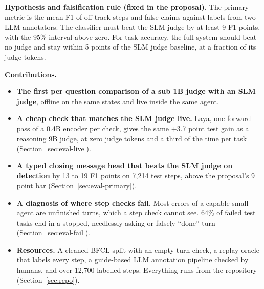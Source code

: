 \documentclass[10pt,a4paper]{article}
\begin{document}
\textbf{Hypothesis and falsification rule (fixed in the proposal).} The primary metric is the mean F1 of off track steps and false claims against labels from two LLM annotators. The classifier must beat the SLM judge by at least 9 F1 points, with the 95\% interval above zero. For task accuracy, the full system should beat no judge and stay within 5 points of the SLM judge baseline, at a fraction of its judge tokens.

\textbf{Contributions.}
\begin{itemize}
  \item \textbf{The first per question comparison of a sub 1B judge with an SLM judge}, offline on the same states and live inside the same agent.
  \item \textbf{A cheap check that matches the SLM judge live.} Laya, one forward pass of a 0.4B encoder per check, gives the same +3.7 point test gain as a reasoning 9B judge, at zero judge tokens and a third of the time per task (Section~\ref{sec:eval-live}).
  \item \textbf{A typed closing message head that beats the SLM judge on detection} by 13 to 19 F1 points on 7,214 test steps, above the proposal's 9 point bar (Section~\ref{sec:eval-primary}).
  \item \textbf{A diagnosis of where step checks fail.} Most errors of a capable small agent are unfinished turns, which a step check cannot see. 64\% of failed test tasks end in a stopped, needlessly asking or falsely ``done'' turn (Section~\ref{sec:eval-fail}).
  \item \textbf{Resources.} A cleaned BFCL split with an empty turn check, a replay oracle that labels every step, a guide-based LLM annotation pipeline checked by humans, and over 12,700 labelled steps. Everything runs from the repository (Section~\ref{sec:repo}).
\end{itemize}
\end{document}
